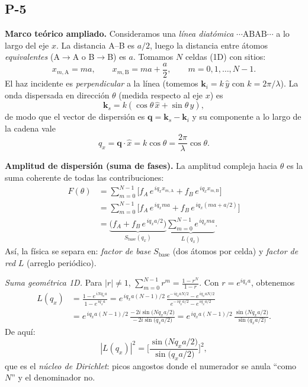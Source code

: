 \documentclass{article}
\begin{document}
\subsection{P-5}

\textbf{Marco teórico ampliado.}  
Consideramos una \emph{línea diatómica} \( \cdots\text{A}\text{B}\text{A}\text{B}\cdots \) a lo largo del eje \(x\).  
La distancia A--B es \(a/2\), luego la distancia entre átomos \emph{equivalentes} (A$\to$A o B$\to$B) es \(a\).  
Tomamos \(N\) celdas (1D) con sitios:
\[
x_{m,\text{A}} = m a, 
\qquad 
x_{m,\text{B}} = m a + \frac{a}{2},
\qquad m=0,1,\dots,N-1.
\]
El haz incidente es \emph{perpendicular} a la línea (tomemos \(\mathbf{k}_i=k\,\hat{y}\) con \(k=2\pi/\lambda\)).  
La onda dispersada en dirección \(\theta\) (medida respecto al eje \(x\)) es
\[
\mathbf{k}_s = k(\cos\theta\,\hat{x}+\sin\theta\,\hat{y}),
\]
de modo que el vector de dispersión es \(\mathbf{q}=\mathbf{k}_s-\mathbf{k}_i\) y su componente a lo largo de la cadena vale
\[
q_x=\mathbf{q}\!\cdot\!\hat{x}=k\cos\theta=\frac{2\pi}{\lambda}\cos\theta.
\]

\bigskip
\textbf{Amplitud de dispersión (suma de fases).}  
La amplitud compleja hacia \(\theta\) es la suma coherente de todas las contribuciones:
\[
\begin{aligned}
F(\theta)
&=\sum_{m=0}^{N-1}\Big[f_A\,e^{\,iq_x x_{m,\text{A}}}+f_B\,e^{\,iq_x x_{m,\text{B}}}\Big] \\
&=\sum_{m=0}^{N-1}\Big[f_A\,e^{\,iq_x m a}+f_B\,e^{\,iq_x (m a + a/2)}\Big]\\
&=\underbrace{\Big(f_A+f_B\,e^{\,i q_x a/2}\Big)}_{\displaystyle S_{\text{base}}(q_x)}
\underbrace{\sum_{m=0}^{N-1} e^{\,i q_x m a}}_{\displaystyle L(q_x)}.
\end{aligned}
\]
Así, la física se separa en: \emph{factor de base} \(S_{\text{base}}\) (dos átomos por celda) y \emph{factor de red} \(L\) (arreglo periódico).

\medskip
\noindent\textit{Suma geométrica 1D.}  
Para \(|r|\neq 1\), \(\sum_{m=0}^{N-1} r^m = \frac{1-r^N}{1-r}\). Con \(r=e^{i q_x a}\), obtenemos
\[
\begin{aligned}
L(q_x)
&=\frac{1-e^{\,iN q_x a}}{1-e^{\,i q_x a}}
= e^{\,i q_x a (N-1)/2}\,\frac{e^{-\,i q_x a N/2}-e^{\,i q_x a N/2}}{e^{-\,i q_x a /2}-e^{\,i q_x a /2}}\\[2pt]
&= e^{\,i q_x a (N-1)/2}\,\frac{-\,2i\sin\!\big(N q_x a/2\big)}{-\,2i\sin\!\big(q_x a/2\big)}
= e^{\,i q_x a (N-1)/2}\,\frac{\sin\!\big(N q_x a/2\big)}{\sin\!\big(q_x a/2\big)}.
\end{aligned}
\]
De aquí:
\[
|L(q_x)|^2=\Bigg[\frac{\sin\!\big(N q_x a/2\big)}{\sin\!\big(q_x a/2\big)}\Bigg]^2,
\]
que es el \emph{núcleo de Dirichlet}: picos angostos donde el numerador se anula “como \(N\)” y el denominador no.
\end{document}
